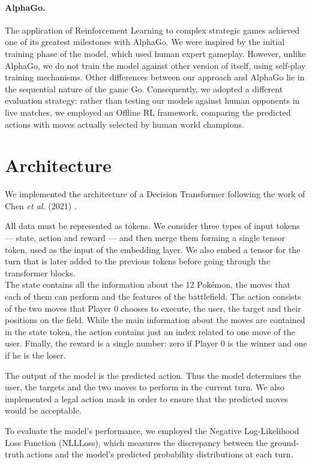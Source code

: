 \documentclass{article}
\begin{document}
\paragraph*{AlphaGo.} 
The application of Reinforcement Learning to complex strategic games achieved one of its greatest milestones with AlphaGo. 
We were inspired by the initial training phase of the model, which used human expert gameplay. However, unlike AlphaGo, we do not train the model against other version of itself, using self-play training mechanisms.
Other differences between our approach and AlphaGo lie in the sequential nature of the game Go. Consequently, we adopted a different evaluation strategy: rather than testing our models against human opponents in live matches, we employed an Offline RL framework, comparing the predicted actions with moves actually selected by human world champions.


\section{Architecture}
We implemented the architecture of a Decision Transformer following the work of Chen \textit{et al.} (2021) \cite{chen2021decision}. 

All data must be represented as tokens. We consider three types of input tokens --- state, action and reward --- and then merge them forming a single tensor token, used as the input of the embedding layer. We also embed a tensor for the turn that is later added to the previous tokens before going through the transformer blocks. \\
The state contains all the information about the 12 Pokémon, the moves that each of them can perform and the features of the battlefield. The action consists of the two moves that Player 0 chooses to execute, the user, the target and their positions on the field. While the main information about the moves are contained in the state token, the action contains just an index related to one move of the user. 
Finally, the reward is a single number: zero if Player 0 is the winner and one if he is the loser. 

The output of the model is the predicted action. Thus the model determines the user, the targets and the two moves to perform in the current turn. We also implemented a legal action mask  in order to ensure that the predicted moves would be acceptable.

To evaluate the model's performance, we employed the Negative Log-Likelihood Loss Function (NLLLoss), which measures the discrepancy between the ground-truth actions and the model's predicted probability distributions at each turn.
\end{document}
